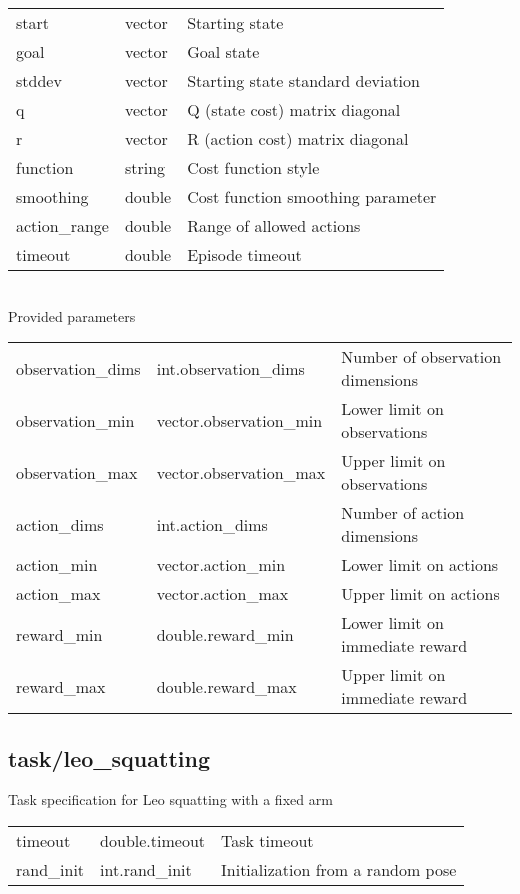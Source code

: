 \noindent\begin{tabular}{@{}lll@{}}
start&vector&Starting state\\
goal&vector&Goal state\\
stddev&vector&Starting state standard deviation\\
q&vector&Q (state cost) matrix diagonal\\
r&vector&R (action cost) matrix diagonal\\
function&string&Cost function style\\
smoothing&double&Cost function smoothing parameter\\
action\_range&double&Range of allowed actions\\
timeout&double&Episode timeout\\
\end{tabular}
\\

\noindent Provided parameters\\

\noindent\begin{tabular}{@{}lll@{}}
observation\_dims&int.observation\_dims&Number of observation dimensions\\
observation\_min&vector.observation\_min&Lower limit on observations\\
observation\_max&vector.observation\_max&Upper limit on observations\\
action\_dims&int.action\_dims&Number of action dimensions\\
action\_min&vector.action\_min&Lower limit on actions\\
action\_max&vector.action\_max&Upper limit on actions\\
reward\_min&double.reward\_min&Lower limit on immediate reward\\
reward\_max&double.reward\_max&Upper limit on immediate reward\\
\end{tabular}
\subsection{task/leo\_squatting}
\noindent Task specification for Leo squatting with a fixed arm\\

\noindent\begin{tabular}{@{}lll@{}}
timeout&double.timeout&Task timeout\\
rand\_init&int.rand\_init&Initialization from a random pose\\
\end{tabular}
\\

